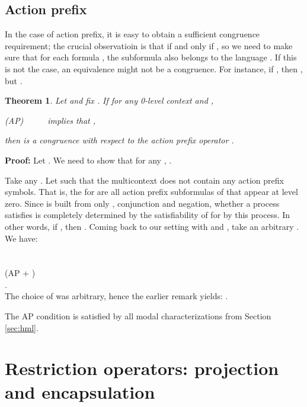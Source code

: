 \documentclass{eptcs}
\newtheorem{theo}{Theorem}
\newenvironment{theorem}{\begin{theo} \rm }{\end{theo}}
\newenvironment{proof}{\begin{trivlist} \item[\hspace{\labelsep}\bf Proof:]}{\hfill  \end{trivlist}}
\begin{document}
\subsection{Action prefix}

In the case of action prefix, it is easy to obtain a sufficient congruence requirement; the crucial observatioin is that  if and only if , so we need to make sure that for each formula , the subformula  also belongs to the language . If this is not the case, an equivalence might not be a congruence. For instance, if , then , but .

\begin{theorem} Let  and fix . If for any 0-level context  and ,
\begin{center}
(AP)~~~~~ implies that ,
\end{center}
then  is a congruence with respect to the action prefix operator .
 \end{theorem}
\begin{proof}
Let . We need to show that for any , .

Take any . Let  such that the multicontext  does not contain any action prefix symbols. That is, the  for  are all action prefix subformulas of  that appear at level zero. Since  is built from only , conjunction and negation, whether a process satisfies  is completely determined by the satisfiability of  for  by this process. In other words, if , then . Coming back to our setting with  and , take an arbitrary . We have:\\
\\
\\
 (AP + )\\
.\\
The choice of  was arbitrary, hence the earlier remark yields: .
\end{proof}
The AP condition is satisfied by all modal characterizations from Section \ref{sec:hml}.


\section{Restriction operators: projection and encapsulation}
\end{document}
